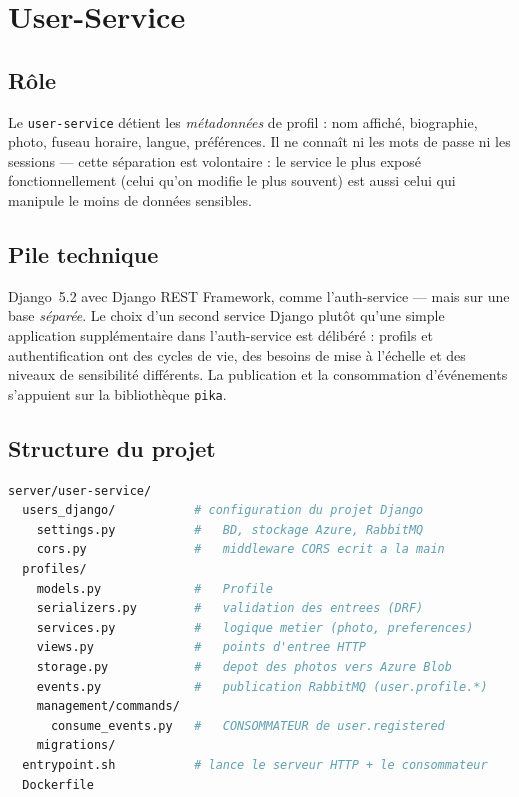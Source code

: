 \documentclass[11pt,a4paper,oneside]{report}
\newcommand{\code}[1]{\texttt{\small #1}}
\begin{document}
\section{User-Service}

\subsection{Rôle}

Le \code{user-service} détient les \emph{métadonnées} de profil : nom affiché,
biographie, photo, fuseau horaire, langue, préférences. Il ne connaît ni les
mots de passe ni les sessions — cette séparation est volontaire : le service le
plus exposé fonctionnellement (celui qu'on modifie le plus souvent) est aussi
celui qui manipule le moins de données sensibles.

\subsection{Pile technique}

Django~5.2 avec Django REST Framework, comme l'auth-service — mais sur une base
\emph{séparée}. Le choix d'un second service Django plutôt qu'une simple
application supplémentaire dans l'auth-service est délibéré : profils et
authentification ont des cycles de vie, des besoins de mise à l'échelle et des
niveaux de sensibilité différents. La publication et la consommation d'événements
s'appuient sur la bibliothèque \code{pika}.

\subsection{Structure du projet}

\begin{lstlisting}[language=bash,numbers=none]
server/user-service/
  users_django/           # configuration du projet Django
    settings.py           #   BD, stockage Azure, RabbitMQ
    cors.py               #   middleware CORS ecrit a la main
  profiles/
    models.py             #   Profile
    serializers.py        #   validation des entrees (DRF)
    services.py           #   logique metier (photo, preferences)
    views.py              #   points d'entree HTTP
    storage.py            #   depot des photos vers Azure Blob
    events.py             #   publication RabbitMQ (user.profile.*)
    management/commands/
      consume_events.py   #   CONSOMMATEUR de user.registered
    migrations/
  entrypoint.sh           # lance le serveur HTTP + le consommateur
  Dockerfile
\end{lstlisting}
\end{document}

